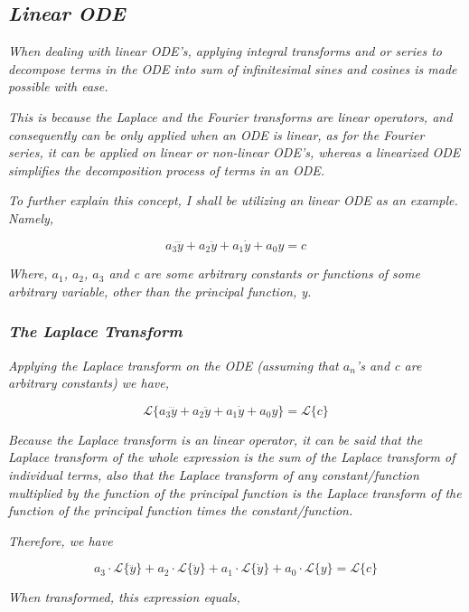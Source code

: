 

\subsection{\textit{Linear ODE}}

	\textit{When dealing with linear ODE's, applying integral transforms and or series to decompose terms in the ODE into sum of infinitesimal sines and cosines is made possible with ease.} 
	
	\textit{This is because the Laplace and the Fourier transforms are linear operators, and consequently can be only applied when an ODE is linear, as for the Fourier series, it can be applied on linear or non-linear ODE's, whereas a linearized ODE simplifies the decomposition process of terms in an ODE.}

	\textit{To further explain this concept, I shall be utilizing an linear ODE as an example. Namely,}
	
		$$a_3\dddot{y} + a_2\ddot{y} + a_1\dot{y} + a_0y = c$$

	\textit{Where, $a_1$, $a_2$, $a_3$ and c are some arbitrary constants or functions of some arbitrary variable, other than the principal function, y.}

	\subsubsection{\textit{The Laplace Transform}}	
		
		\textit{Applying the Laplace transform on the ODE (assuming that $a_n$'s and c are arbitrary constants) we have,}
		
			$$\mathcal{L}\{a_3\dddot{y} + a_2\ddot{y} + a_1\dot{y} + a_0y\} = \mathcal{L}\{c\}$$		
			
		\textit{Because the Laplace transform is an linear operator, it can be said that the Laplace transform of the whole expression is the sum of the Laplace transform of individual terms, also that the Laplace transform of any constant/function multiplied by the function of the principal function is the Laplace transform of the function of the principal function times the constant/function.}			
			
		\textit{Therefore, we have}			
			
			$$a_3\cdot\mathcal{L}\{\dddot{y}\} + a_2\cdot\mathcal{L}\{\ddot{y}\} + a_1\cdot\mathcal{L}\{\dot{y}\} + a_0\cdot\mathcal{L}\{y\} = \mathcal{L}\{c\}$$
		
		\textit{When transformed, this expression equals,}		
		

